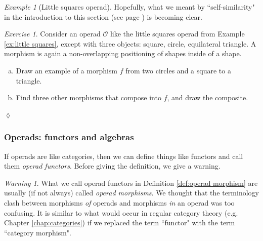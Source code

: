 \documentclass{book}
\def\mc{\mathcal}
\def\mcO{\mc{O}}
\theoremstyle{remark}
\newtheorem{example}[subsubsection]{Example}
\newtheorem{warning}[subsubsection]{Warning}
\newtheorem{exc}[subsubsection]{Exercise}
\newenvironment{exercise}{\begin{exc}}{\hspace*{\fill}$\lozenge$\end{exc}}
\theoremstyle{definition}
\def\sexc{\begin{enumerate}[a.)]\setlength{\itemsep}{.1cm}\setlength{\parskip}{.1cm}\item}
\def\next{\item}
\def\endsexc{\end{enumerate}}
\begin{document}
\begin{example}[Little squares operad]
Hopefully, what we meant by ``self-similarity" in the introduction to this section (see page \pageref{sec:operad}) is becoming clear.

\end{example}

\begin{exercise}\label{exc:little shapes}
Consider an operad $\mcO$ like the little squares operad from Example \ref{ex:little squares}, except with three objects: square, circle, equilateral triangle. A morphism is again a non-overlapping positioning of shapes inside of a shape. 
\sexc Draw an example of a morphism $f$ from two circles and a square to a triangle.
\next Find three other morphisms that compose into $f$, and draw the composite.
\endsexc
\end{exercise}


\subsubsection{Operads: functors and algebras}

If operads are like categories, then we can define things like functors and call them {\em operad functors}. Before giving the definition, we give a warning.

\begin{warning}

What we call operad functors in Definition \ref{def:operad morphism} are usually (if not always) called {\em operad morphisms}. We thought that the terminology clash between morphisms {\em of} operads and morphisms {\em in} an operad was too confusing. It is similar to what would occur in regular category theory (e.g. Chapter \ref{chap:categories}) if we replaced the term ``functor" with the term ``category morphism". 

\end{warning}
\end{document}
